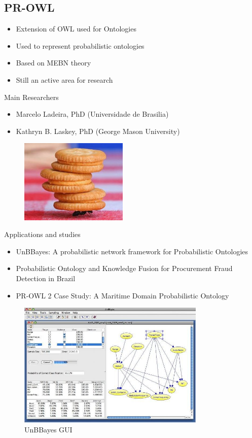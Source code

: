 \subsection{PR-OWL}

\begin{frame}
	\begin{itemize}
		\item Extension of OWL used for Ontologies
		\item Used to represent probabilistic ontologies
		\item Based on MEBN theory
		\item Still an active area for research
	\end{itemize}
\end{frame}

\begin{frame}
	\begin{block}{Main Researchers}
		\begin{itemize}
			\item Marcelo Ladeira, PhD (Universidade de Brasilia)
			\item Kathryn B. Laskey, PhD (George Mason University)
		\end{itemize}
	\end{block}
	\begin{figure}
		\centering
		\includegraphics[height=4cm]{images/researchers}
	\end{figure}
\end{frame}

\begin{frame}
	\begin{block}{Applications and studies}
		\begin{itemize}
			\item UnBBayes: A probabilistic network framework for Probabilistic Ontologies~\cite{UnBBayes08}
			\item Probabilistic Ontology and Knowledge Fusion for Procurement Fraud Detection in Brazil~\cite{Rommel13}
			\item PR-OWL 2 Case Study: A Maritime Domain Probabilistic Ontology~\cite{Laskey11}
		\end{itemize}
	\end{block}
\end{frame}

\begin{frame}
	\begin{figure}
		\centering
		\includegraphics[height=6cm]{images/unbbayes}
		\caption{UnBBayes GUI}
	\end{figure}
\end{frame}